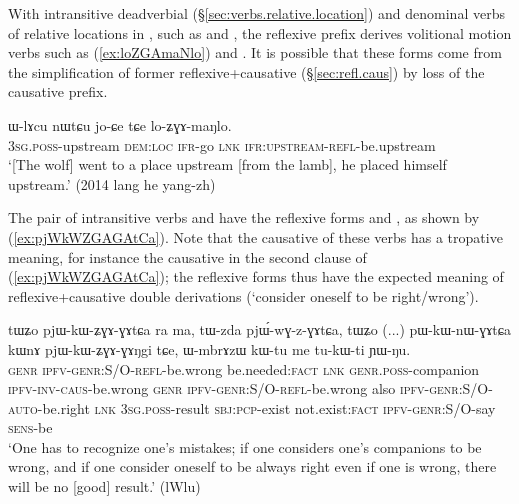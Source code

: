 With intransitive deadverbial (§\ref{sec:verbs.relative.location}) and denominal verbs of relative locations in , such as  and , the reflexive prefix derives  volitional motion verbs such as  (\ref{ex:loZGAmaNlo}) and . It is possible that these forms come from the simplification of former reflexive+causative (§\ref{sec:refl.caus}) by loss of the causative prefix.

\begin{exe}
\ex \label{ex:loZGAmaNlo}
\gll  ɯ-lɤcu nɯtɕu jo-ɕe tɕe lo-ʑɣɤ-maŋlo. \\
\textsc{3sg}.\textsc{poss}-upstream \textsc{dem}:\textsc{loc} \textsc{ifr}-go \textsc{lnk} \textsc{ifr}:\textsc{upstream}-\textsc{refl}-be.upstream \\
\glt `[The wolf] went to a place upstream [from the lamb], he placed himself upstream.' (2014 lang he yang-zh)
\end{exe}

The pair of intransitive verbs  and  have the reflexive forms  and , as shown by (\ref{ex:pjWkWZGAGAtCa}). Note that the causative of these verbs has a tropative meaning, for  instance the causative  in the second clause of (\ref{ex:pjWkWZGAGAtCa}); the reflexive forms thus have the expected meaning of reflexive+causative double derivations (`consider oneself to be right/wrong').

\begin{exe}
\ex \label{ex:pjWkWZGAGAtCa}
\gll tɯʑo pjɯ-kɯ-ʑɣɤ-ɣɤtɕa ra ma, tɯ-zda pjɯ́-wɣ-z-ɣɤtɕa, tɯʑo %
(...) pɯ-kɯ-nɯ-ɣɤtɕa kɯnɤ pjɯ-kɯ-ʑɣɤ-ɣɤŋgi tɕe,  ɯ-mbrɤzɯ kɯ-tu me tu-kɯ-ti ɲɯ-ŋu. \\
\textsc{genr} \textsc{ipfv}-\textsc{genr}:S/O-\textsc{refl}-be.wrong be.needed:\textsc{fact} \textsc{lnk} \textsc{genr}.\textsc{poss}-companion \textsc{ipfv}-\textsc{inv}-\textsc{caus}-be.wrong \textsc{genr} {  } \textsc{ipfv}-\textsc{genr}:S/O-\textsc{refl}-be.wrong also  \textsc{ipfv}-\textsc{genr}:S/O-\textsc{auto}-be.right  \textsc{lnk} \textsc{3sg}.\textsc{poss}-result \textsc{sbj}:\textsc{pcp}-exist not.exist:\textsc{fact} \textsc{ipfv}-\textsc{genr}:S/O-say \textsc{sens}-be \\ 
\glt `One has to recognize one's mistakes; if one considers one's companions to be wrong, and if one consider oneself to be always right even if one is wrong, there will be no [good] result.' (lWlu)
\end{exe}

